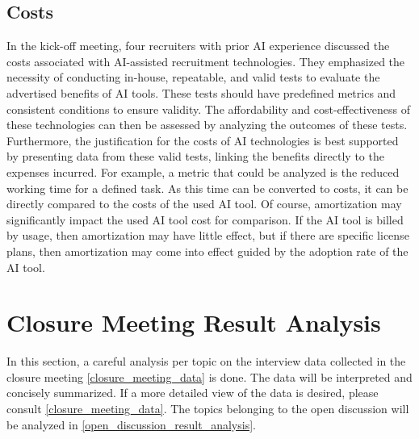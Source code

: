 \documentclass[draft,final]{thesisclass} %
\begin{document}
\subsection{Costs}
In the kick-off meeting, four recruiters with prior \acs{AI} experience discussed the costs associated with \acs{AI}-assisted recruitment technologies. They emphasized the necessity of conducting in-house, repeatable, and valid tests to evaluate the advertised benefits of \acs{AI} tools. These tests should have predefined metrics and consistent conditions to ensure validity. The affordability and cost-effectiveness of these technologies can then be assessed by analyzing the outcomes of these tests. Furthermore, the justification for the costs of \acs{AI} technologies is best supported by presenting data from these valid tests, linking the benefits directly to the expenses incurred. For example, a metric that could be analyzed is the reduced working time for a defined task. As this time can be converted to costs, it can be directly compared to the costs of the used \acs{AI} tool. Of course, amortization may significantly impact the used \acs{AI} tool cost for comparison. If the \acs{AI} tool is billed by usage, then amortization may have little effect, but if there are specific license plans, then amortization may come into effect guided by the adoption rate of the \acs{AI} tool.

\section{Closure Meeting Result Analysis}
In this section, a careful analysis per topic on the interview data collected in the closure meeting \ref{closure_meeting_data} is done. The data will be interpreted and concisely summarized. If a more detailed view of the data is desired, please consult \ref{closure_meeting_data}. The topics belonging to the open discussion will be analyzed in \ref{open_discussion_result_analysis}.
\end{document}
